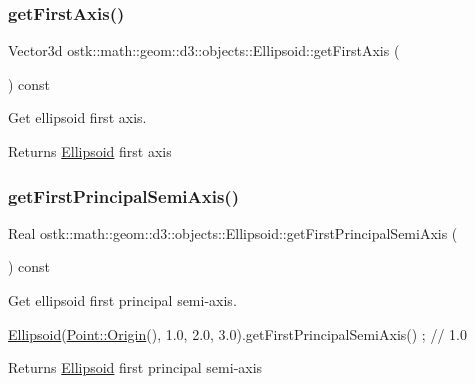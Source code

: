 \subsubsection{\texorpdfstring{get\+First\+Axis()}{getFirstAxis()}}
{\footnotesize\ttfamily Vector3d ostk\+::math\+::geom\+::d3\+::objects\+::\+Ellipsoid\+::get\+First\+Axis (\begin{DoxyParamCaption}{ }\end{DoxyParamCaption}) const}



Get ellipsoid first axis. 

\begin{DoxyReturn}{Returns}
\hyperlink{classostk_1_1math_1_1geom_1_1d3_1_1objects_1_1_ellipsoid}{Ellipsoid} first axis 
\end{DoxyReturn}
\mbox{\label{classostk_1_1math_1_1geom_1_1d3_1_1objects_1_1_ellipsoid_a0d922209dffb806def71604d7dde2ba7}} 
\subsubsection{\texorpdfstring{get\+First\+Principal\+Semi\+Axis()}{getFirstPrincipalSemiAxis()}}
{\footnotesize\ttfamily Real ostk\+::math\+::geom\+::d3\+::objects\+::\+Ellipsoid\+::get\+First\+Principal\+Semi\+Axis (\begin{DoxyParamCaption}{ }\end{DoxyParamCaption}) const}



Get ellipsoid first principal semi-\/axis. 


\begin{DoxyCode}
\hyperlink{classostk_1_1math_1_1geom_1_1d3_1_1objects_1_1_ellipsoid_acd84276f65a14db12623402a411712b7}{Ellipsoid}(\hyperlink{classostk_1_1math_1_1geom_1_1d3_1_1objects_1_1_point_a079c199f08b015d456d02728a71b534c}{Point::Origin}(), 1.0, 2.0, 3.0).getFirstPrincipalSemiAxis() ; \textcolor{comment}{// 1.0}
\end{DoxyCode}


\begin{DoxyReturn}{Returns}
\hyperlink{classostk_1_1math_1_1geom_1_1d3_1_1objects_1_1_ellipsoid}{Ellipsoid} first principal semi-\/axis 
\end{DoxyReturn}
\mbox{\label{classostk_1_1math_1_1geom_1_1d3_1_1objects_1_1_ellipsoid_aea24d2d268d701c31a18f2ddac2cd394}} 
